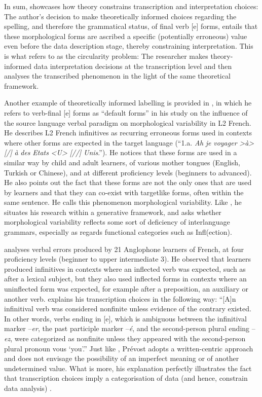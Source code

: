 \documentclass[output=paper,colorlinks,citecolor=brown,modfonts,nonflat]{../langscibook}
\begin{document}
In sum, \citet{Herschensohn2001} showcases how theory constrains transcription and interpretation choices: The author’s decision to make theoretically informed choices regarding the spelling, and therefore the grammatical status, of final verb [e] forms, entails that these morphological forms are ascribed a specific (potentially erroneous) value even before the data description stage, thereby constraining interpretation. This is what \citet[2]{Mondada2000} refers to as the circularity problem: The researcher makes theory-informed data interpretation decisions at the transcription level and then analyses the transcribed phenomenon in the light of the same theoretical framework.

Another example of theoretically informed labelling is provided in \citet{Prévost2007French}, in which he refers to verb-final [e] forms as “default forms” in his study on the influence of the source language verbal paradigm on morphological variability in L2 French. He describes L2 French infinitives as recurring erroneous forms used in contexts where other forms are expected in the target language (“1.a. \textit{Ah} \textit{je} \textit{voyager} \textit{>à>} \textit{[/]} \textit{à} \textit{des} \textit{Etats} \textit{<U>} \textit{[//]} \textit{Unis}.”). He notices that these forms are used in a similar way by child and adult learners, of various mother tongues (English, Turkish or Chinese), and at different proficiency levels (beginners to advanced). He also points out the fact that these forms are not the only ones that are used by learners and that they can co-exist with targetlike forms, often within the same sentence. He calls this phenomenon morphological variability. Like \citet{Herschensohn2001}, he situates his research within a generative framework, and asks whether morphological variability reflects some sort of deficiency of interlanguage grammars, especially as regards functional categories such as Infl(ection). 

\citet{Prévost2007English} analyses verbal errors produced by 21 Anglophone learners of French, at four proficiency levels (beginner to upper intermediate 3). He observed that learners produced infinitives in contexts where an inflected verb was expected, such as after a lexical subject, but they also used inflected forms in contexts where an uninflected form was expected, for example after a preposition, an auxiliary or another verb. \citet[360]{Prévost2007English} explains his transcription choices in the following way: “[A]n infinitival verb was considered nonfinite unless evidence of the contrary existed. In other words, verbs ending in [e], which is ambiguous between the infinitival marker –\textit{er}, the past participle marker –\textit{é}, and the second-person plural ending –\textit{ez}, were categorized as nonfinite unless they appeared with the second-person plural pronoun vous ‘you’.” Just like \citet{Herschensohn2001}, Prévost adopts a written-centric approach and does not envisage the possibility of an imperfect meaning or of another undetermined value. What is more, his explanation perfectly illustrates the fact that transcription choices imply a categorisation of data (and hence, constrain data analysis) \citep{Mondada2007}.
\end{document}
